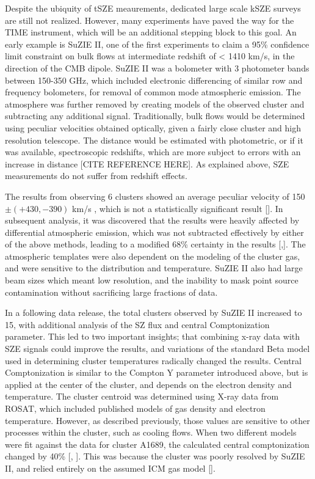 \documentclass[manuscript]{aastex}
\begin{document}
Despite the ubiquity of tSZE meaurements, dedicated large scale kSZE surveys are still not realized. However, many experiments have paved the way for the TIME instrument, which will be an additional stepping block to this goal. An early example is SuZIE II, one of the first experiments to claim a 95\% confidence limit constraint on bulk flows at intermediate redshift of < 1410 km/s, in the direction of the CMB dipole. SuZIE II was a bolometer with 3 photometer bands between 150-350 GHz, which included electronic differencing of similar row and frequency bolometers, for removal of common mode atmospheric emission. The atmosphere was further removed by creating models of the observed cluster and subtracting any additional signal. Traditionally, bulk flows would be determined using peculiar velocities obtained optically, given a fairly close cluster and high resolution telescope. The distance would be estimated with photometric, or if it was available, spectroscopic redshifts, which are more subject to errors with an increase in distance [CITE REFERENCE HERE]. As explained above, SZE measurements do not suffer from redshift effects. 

The results from observing 6 clusters showed an average peculiar velocity of 150 $\pm (+430,-390)$ km/s , which is not a statistically significant result [\cite{Benson2003}]. In subsequent analysis, it was discovered that the results were heavily affected by differential atmospheric emission, which was not subtracted effectively by either of the above methods, leading to a modified 68\% certainty in the results [\cite{Mauskopf2000},\cite{Carlstrom2002}]. The atmospheric templates were also dependent on the modeling of the cluster gas, and were sensitive to the distribution and temperature. SuZIE II also had large beam sizes which meant low resolution, and the inability to mask point source contamination without sacrificing large fractions of data. 

In a following data release, the total clusters observed by SuZIE II increased to 15, with additional analysis of the SZ flux and central Comptonization parameter. This led to two important insights; that combining x-ray data with SZE signals could improve the results, and variations of the standard Beta model used in determining cluster temperatures radically changed the results. Central Comptonization is similar to the Compton Y parameter introduced above, but is applied at the center of the cluster, and depends on the electron density and temperature. The cluster centroid was determined using X-ray data from ROSAT, which included published models of gas density and electron temperature. However, as described previously, those values are sensitive to other processes within the cluster, such as cooling flows. When two different models were fit against the data for cluster A1689, the calculated central comptonization changed by 40\% [\cite{Holzapfel1997b}, \cite{Reese2002}]. This was because the cluster was poorly resolved by SuZIE II, and relied entirely on the assumed ICM gas model [\cite{Benson2004}]. 
\end{document}
